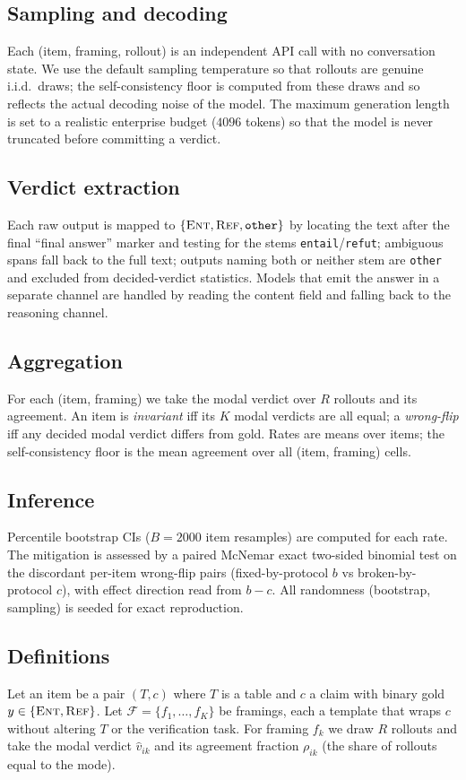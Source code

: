 \documentclass[10pt]{article}
\begin{document}
\subsection{Sampling and decoding}
Each (item, framing, rollout) is an independent API call with no conversation state. We use
the default sampling temperature so that rollouts are genuine i.i.d.\ draws; the
self-consistency floor is computed from these draws and so reflects the actual decoding noise
of the model. The maximum generation length is set to a realistic enterprise budget
($4096$ tokens) so that the model is never truncated before committing a verdict.

\subsection{Verdict extraction}
Each raw output is mapped to $\{\textsc{Ent},\textsc{Ref},\texttt{other}\}$ by locating the
text after the final ``final answer'' marker and testing for the stems
\texttt{entail}/\texttt{refut}; ambiguous spans fall back to the full text; outputs naming
both or neither stem are \texttt{other} and excluded from decided-verdict statistics. Models
that emit the answer in a separate channel are handled by reading the content field and
falling back to the reasoning channel.

\subsection{Aggregation}
For each (item, framing) we take the modal verdict over $R$ rollouts and its agreement. An item
is \emph{invariant} iff its $K$ modal verdicts are all equal; a \emph{wrong-flip} iff any
decided modal verdict differs from gold. Rates are means over items; the self-consistency floor
is the mean agreement over all (item, framing) cells.

\subsection{Inference}
Percentile bootstrap CIs ($B=2000$ item resamples) are computed for each rate. The mitigation
is assessed by a paired McNemar exact two-sided binomial test on the discordant per-item
wrong-flip pairs (fixed-by-protocol $b$ vs broken-by-protocol $c$), with effect direction read
from $b-c$. All randomness (bootstrap, sampling) is seeded for exact reproduction.

\subsection{Definitions}\label{sec:fiv}
Let an item be a pair $(T, c)$ where $T$ is a table and $c$ a claim with binary gold
$y\in\{\textsc{Ent},\textsc{Ref}\}$. Let $\mathcal{F}=\{f_1,\dots,f_K\}$ be framings, each a
template that wraps $c$ without altering $T$ or the verification task. For framing $f_k$ we
draw $R$ rollouts and take the modal verdict $\hat{v}_{ik}$ and its agreement fraction
$\rho_{ik}$ (the share of rollouts equal to the mode).
\end{document}
